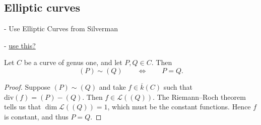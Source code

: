 \subsection{Elliptic curves}

- Use Elliptic Curves from Silverman

- \href{https://esc.fnwi.uva.nl/thesis/centraal/files/f1118947783.pdf}{use this?}

\begin{lemma}
    Let $C$ be a curve of genus one, and let $P, Q \in C$. Then
    \[ (P) \sim{} (Q) \qquad \iff \qquad P = Q . \]
\end{lemma}
\begin{proof}
    Suppose $(P) \sim{} (Q)$ and take $f \in \overline{k}(C)$ such that $\text{div}(f) = (P) - (Q)$. Then $f \in \mathcal{L}((Q))$. The Riemann--Roch theorem tells us that $\dim \mathcal{L}((Q)) = 1$, which must be the constant functions. Hence $f$ is constant, and thus $P = Q$.
\end{proof}

